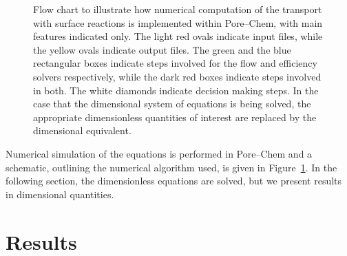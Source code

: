 \documentclass[preprint, 1p, authoryear]{elsarticle}
\begin{document}
\begin{figure}
\caption{\footnotesize Flow chart to illustrate how numerical computation of the transport with surface reactions is implemented within Pore--Chem, with main features indicated only. The light red ovals indicate input files, while the yellow ovals indicate output files. The green and  the blue rectangular boxes indicate steps involved for  the flow  and efficiency solvers respectively, while the dark red boxes indicate steps involved in both.  The white diamonds indicate decision making steps. In the case that the dimensional system of equations is being solved,  the appropriate dimensionless quantities of interest are replaced by the dimensional equivalent.   }
\label{fig:Flowchart}
\end{figure}
\normalsize




Numerical simulation of the equations is performed in Pore--Chem  and a schematic, outlining the numerical algorithm used,  is given in  Figure~\ref{fig:Flowchart}. In the following  section, the dimensionless equations are solved, but we present results in dimensional quantities.


\section{Results}
\label{sec:Results}
\end{document}
